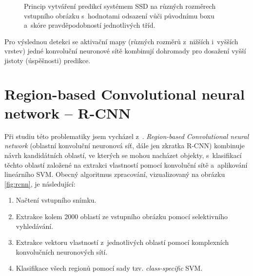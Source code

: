 \begin{figure}[H]
    \centering
    \caption{Princip vytváření predikcí systémem SSD na různých rozměrech vstupního obrázku s~hodnotami odsazení vůči původnímu boxu a~skóre pravděpodobností jednotlivých tříd.\footnotemark}
    \label{fig:ssd}
\end{figure}


Pro výslednou detekci se aktivační mapy (různých rozměrů z~nižších i~vyšších vrstev) jedné konvoluční neuronové sítě kombinují dohromady pro dosažení vyšší jistoty (úspěšnosti) predikce.



\section{Region-based Convolutional neural network -- R-CNN}
\label{rcnnTeorie}
Při studiu této problematiky jsem vycházel z~\cite{rcnn,fast-rcnn,selective-search}. \emph{Region-based Convolutional neural network} (oblastní konvoluční neuronová síť, dále jen zkratka R-CNN) kombinuje návrh kandidátních oblastí, ve kterých se mohou nacházet objekty, s~klasifikací těchto oblastí založené na extrakci vlastností pomocí konvoluční sítě a~aplikování lineárního SVM. Obecný algoritmus zpracování, vizualizovaný na obrázku \ref{fig:rcnn}, je následující:

\begin{enumerate}
    \item Načtení vstupního snímku.
    \item Extrakce kolem 2000 oblastí ze vstupního obrázku pomocí selektivního vyhledávání.
    \item Extrakce vektoru vlastností z~jednotlivých oblastí pomocí komplexních konvolučních neuronových sítí.
    \item Klasifikace všech regionů pomocí sady tzv. \emph{class-specific} SVM.
\end{enumerate}

